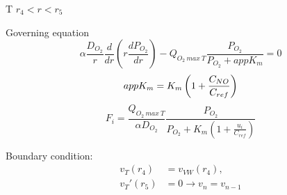 \documentclass[8pt, a4paper]{article}
\begin{document}
  T $r_4<r<r_5$
  
  Governing equation
  \begin{equation*}
  \alpha\frac{D_{O_2}}{r}\frac{d}{dr}\left(r\frac{dP_{O_2}}{dr}\right)-Q_{O_2\:
    max\:T}\frac{P_{O_2}}{P_{O_2}+appK_m}=0
  \end{equation*}
  \begin{equation}
  appK_m=K_m\left(1+\frac{C_{NO}}{C_{ref}}\right)
  \end{equation}
  \begin{equation*}
  F_i=\frac{Q_{O_2\:max\:T}}{\alpha 
    D_{O_2}}\frac{P_{O_2}}{P_{O_2}+K_m\left(1+\frac{u_i}{C_{ref}}\right)}
  \end{equation*}
  
  Boundary condition:
  \begin{align*}
  v_{T}(r_4)&=v_{VW}(r_4),\\
  v_{T}'(r_5)&=0\rightarrow v_n=v_{n-1}
  \end{align*}
\end{document}
